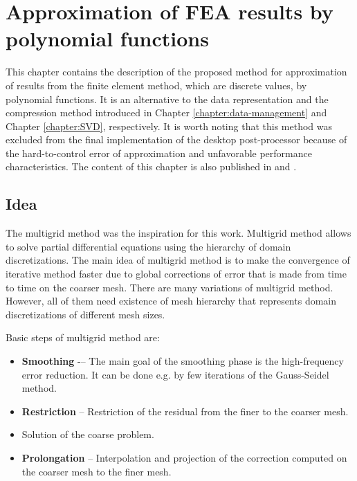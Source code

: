\chapter{Approximation of FEA results by polynomial functions}
\label{chapter:approximation}


This chapter contains the description of the proposed method for approximation of results from the finite element method, which are discrete values, by polynomial functions. It is an alternative to the data representation and the compression method introduced in Chapter \ref{chapter:data-management} and Chapter \ref{chapter:SVD}, respectively. It is worth noting that this method was excluded from the final implementation of the desktop post-processor because of the hard-to-control error of approximation and unfavorable performance characteristics. The content of this chapter is also published in \cite{Benes2016} and \cite{Benes2016Pollack}.


\section{Idea}

The multigrid method \cite{Briggs2000,Shaidurov2013,Hackbusch2013,Elman2014} was the inspiration for this work. Multigrid method allows to solve partial differential equations using the hierarchy of domain discretizations. The main idea of multigrid method is to make the convergence of iterative method faster due to global corrections of error that is made from time to time on the coarser mesh. There are many variations of multigrid method. However, all of them need existence of mesh hierarchy that represents domain discretizations of different mesh sizes.

Basic steps of multigrid method are:

\begin{itemize}
    \item \textbf{Smoothing} -– The main goal of the smoothing phase is the high-frequency error reduction. It can be done e.g. by few iterations of the Gauss-Seidel method.
    \item \textbf{Restriction} -- Restriction of the residual from the finer to the coarser mesh.
    \item Solution of the coarse problem.
    \item \textbf{Prolongation} -- Interpolation and projection of the correction computed on the coarser mesh to the finer mesh.
\end{itemize}

